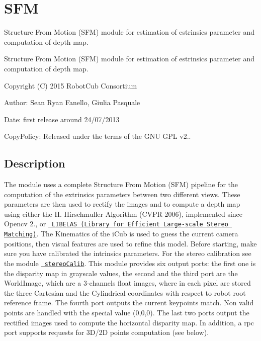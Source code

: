 \section{S\+FM}
\label{group__SFM}


Structure From Motion (S\+FM) module for estimation of estrinsics parameter and computation of depth map.  


Structure From Motion (S\+FM) module for estimation of estrinsics parameter and computation of depth map. 

Copyright (C) 2015 Robot\+Cub Consortium

Author\+: Sean Ryan Fanello, Giulia Pasquale

Date\+: first release around 24/07/2013

Copy\+Policy\+: Released under the terms of the G\+NU G\+PL v2..\hypertarget{group__SFM_intro_sec}{}\subsection{Description}\label{group__SFM_intro_sec}
The module uses a complete Structure From Motion (S\+FM) pipeline for the computation of the extrinsics parameters between two different views. These parameters are then used to rectify the images and to compute a depth map using either the H. Hirschmuller Algorithm (C\+V\+PR 2006), implemented since Opencv 2., or \href{http://www.cvlibs.net/software/libelas/}{\texttt{ L\+I\+B\+E\+L\+AS (Library for Efficient Large-\/scale Stereo Matching)}}. The Kinematics of the i\+Cub is used to guess the current camera positions, then visual features are used to refine this model. Before starting, make sure you have calibrated the intrinsics parameters. For the stereo calibration see the module \href{http://wiki.icub.org/iCub/main/dox/html/group__icub__stereoCalib.html}{\texttt{ stereo\+Calib}}. This module provides six output ports\+: the first one is the disparity map in grayscale values, the second and the third port are the World\+Image, which are a 3-\/channels float images, where in each pixel are stored the three Cartesian and the Cylindrical coordinates with respect to robot root reference frame. The fourth port outputs the current keypoints match. Non valid points are handled with the special value (0,0,0). The last two ports output the rectified images used to compute the horizontal disparity map. In addition, a rpc port supports requests for 3D/2D points computation (see below).

